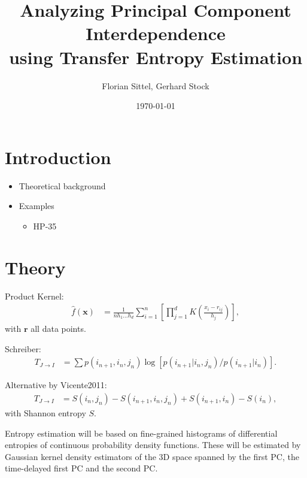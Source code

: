 \documentclass[12pt,a4paper,twoside,english,fleqn,preprint,aps,prb]{revtex4}
\newcommand{\rr}{\mathbf{r}}
\newcommand{\xx}{\mathbf{x}}
\begin{document}
\author{Florian Sittel, Gerhard Stock} 
\title{Analyzing Principal Component Interdependence\\ using Transfer Entropy Estimation}
\date{\today}

\begingroup
 \let\clearpage\relax
 \maketitle
\endgroup

\tableofcontents
\clearpage


\section{Introduction}
\begin{itemize}
  \item Theoretical background
  \item Examples
        \begin{itemize}
          \item HP-35
        \end{itemize}
\end{itemize}


\section{Theory}

Product Kernel:
\begin{align}
  \hat{f}(\xx) &= \frac{1}{n h_1 \dots h_d} \sum_{i=1}^{n}\left[ \prod_{j=1}^{d} K\left(\frac{x_i - r_{ij}}{h_j} \right)\right],
\end{align}
with $\rr$ all data points.

Schreiber:
\begin{align}
  T_{J \rightarrow I} &= \sum p(i_{n+1}, i_n, j_n) \log \left[p(i_{n+1} \vert i_n, j_n) / p(i_{n+1} \vert i_n) \right].
\end{align}

Alternative by Vicente2011:
\begin{align}
  T_{J \rightarrow I} &= S(i_n, j_n) - S(i_{n+1}, i_n, j_n) + S(i_{n+1}, i_n) - S(i_n),
\end{align}
with Shannon entropy $S$.


Entropy estimation will be based on fine-grained histograms of differential entropies of continuous probability density functions.
These will be estimated by Gaussian kernel density estimators of the 3D space spanned by the first PC, the time-delayed first PC
and the second PC.




\end{document}
